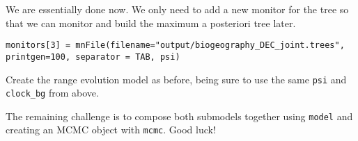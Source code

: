 We are essentially done now. We  only need to add a new monitor for the tree so that we can monitor and build the maximum a posteriori tree later.
{\tt \small \begin{snugshade*}
\begin{lstlisting}
monitors[3] = mnFile(filename="output/biogeography_DEC_joint.trees", printgen=100, separator = TAB, psi)
\end{lstlisting}
\end{snugshade*}}

Create the range evolution model as before, being sure to use the same {\tt psi} and {\tt clock\_bg} from above.

The remaining challenge is to compose both submodels together using {\tt model} and creating an MCMC object with {\tt mcmc}. Good luck!

\newpage
